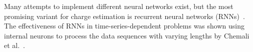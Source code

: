 Many attempts to implement different neural networks exist, but the most promising variant for charge estimation is recurrent neural networks (RNNs)~\cite{song_lithium-ion_2018, Chemali2017, mamo_long_2020, jiao_gru-rnn_2020, xiao_accurate_2019, javid_adaptive_2020, zhang_deep_2020}.
The effectiveness of RNNs in time-series-dependent problems was shown using internal neurons to process the data sequences with varying lengths by Chemali et al.~\cite{Chemali2017}.

